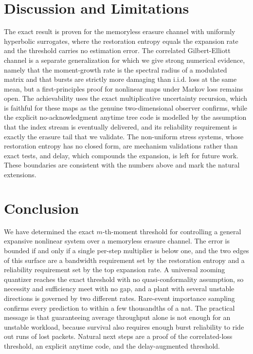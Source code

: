 \documentclass[journal]{IEEEtran}
\theoremstyle{definition}
\theoremstyle{remark}
\begin{document}
\section{Discussion and Limitations}\label{sec:disc}
The exact result is proven for the memoryless erasure channel with uniformly hyperbolic surrogates, where the
restoration entropy equals the expansion rate and the threshold carries no estimation error. The correlated
Gilbert-Elliott channel is a separate generalization for which we give strong numerical evidence, namely that the
moment-growth rate is the spectral radius of a modulated matrix and that bursts are strictly more damaging than
i.i.d. loss at the same mean, but a first-principles proof for nonlinear maps under Markov loss remains open. The
achievability uses the exact multiplicative uncertainty recursion, which is faithful for these maps as the genuine
two-dimensional observer confirms, while the explicit no-acknowledgment anytime tree code is modelled by the
assumption that the index stream is eventually delivered, and its reliability requirement is exactly the erasure
tail that we validate. The non-uniform stress systems, whose restoration entropy has no closed form, are mechanism
validations rather than exact tests, and delay, which compounds the expansion, is left for future work. These
boundaries are consistent with the numbers above and mark the natural extensions.

\section{Conclusion}\label{sec:conc}
We have determined the exact $m$-th-moment threshold for controlling a general expansive nonlinear system over a
memoryless erasure channel. The error is bounded if and only if a single per-step multiplier is below one, and the
two edges of this surface are a bandwidth requirement set by the restoration entropy and a reliability requirement
set by the top expansion rate. A universal zooming quantizer reaches the exact threshold with no
quasi-conformality assumption, so necessity and sufficiency meet with no gap, and a plant with several unstable
directions is governed by two different rates. Rare-event importance sampling confirms every prediction to within
a few thousandths of a nat. The practical message is that guaranteeing average throughput alone is not enough for
an unstable workload, because survival also requires enough burst reliability to ride out runs of lost packets.
Natural next steps are a proof of the correlated-loss threshold, an explicit anytime code, and the delay-augmented
threshold.



\end{document}
